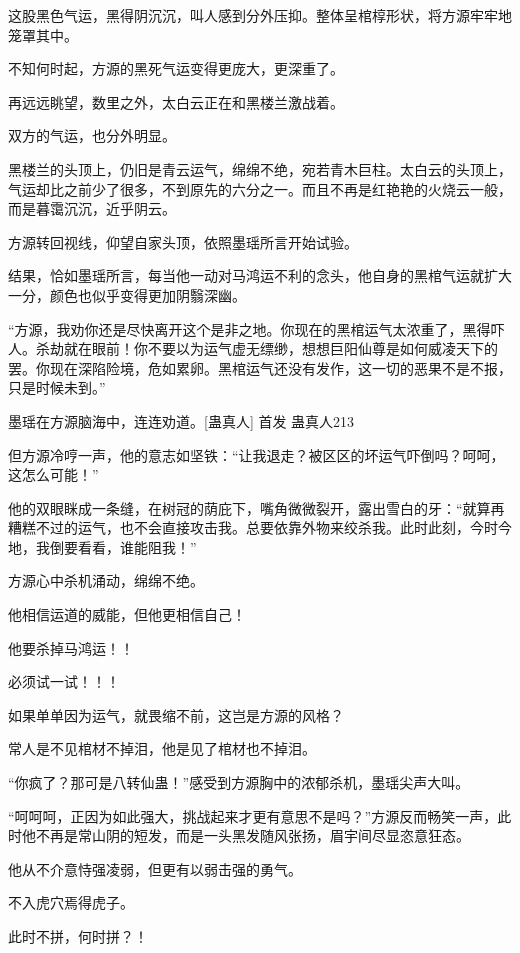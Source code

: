 
\begin{this_body}

这股黑色气运，黑得阴沉沉，叫人感到分外压抑。整体呈棺椁形状，将方源牢牢地笼罩其中。

不知何时起，方源的黑死气运变得更庞大，更深重了。

再远远眺望，数里之外，太白云正在和黑楼兰激战着。

双方的气运，也分外明显。

黑楼兰的头顶上，仍旧是青云运气，绵绵不绝，宛若青木巨柱。太白云的头顶上，气运却比之前少了很多，不到原先的六分之一。而且不再是红艳艳的火烧云一般，而是暮霭沉沉，近乎阴云。

方源转回视线，仰望自家头顶，依照墨瑶所言开始试验。

结果，恰如墨瑶所言，每当他一动对马鸿运不利的念头，他自身的黑棺气运就扩大一分，颜色也似乎变得更加阴翳深幽。

“方源，我劝你还是尽快离开这个是非之地。你现在的黑棺运气太浓重了，黑得吓人。杀劫就在眼前！你不要以为运气虚无缥缈，想想巨阳仙尊是如何威凌天下的罢。你现在深陷险境，危如累卵。黑棺运气还没有发作，这一切的恶果不是不报，只是时候未到。”

墨瑶在方源脑海中，连连劝道。[蛊真人]  首发 蛊真人213

但方源冷哼一声，他的意志如坚铁：“让我退走？被区区的坏运气吓倒吗？呵呵，这怎么可能！”

他的双眼眯成一条缝，在树冠的荫庇下，嘴角微微裂开，露出雪白的牙：“就算再糟糕不过的运气，也不会直接攻击我。总要依靠外物来绞杀我。此时此刻，今时今地，我倒要看看，谁能阻我！”

方源心中杀机涌动，绵绵不绝。

他相信运道的威能，但他更相信自己！

他要杀掉马鸿运！！

必须试一试！！！

如果单单因为运气，就畏缩不前，这岂是方源的风格？

常人是不见棺材不掉泪，他是见了棺材也不掉泪。

“你疯了？那可是八转仙蛊！”感受到方源胸中的浓郁杀机，墨瑶尖声大叫。

“呵呵呵，正因为如此强大，挑战起来才更有意思不是吗？”方源反而畅笑一声，此时他不再是常山阴的短发，而是一头黑发随风张扬，眉宇间尽显恣意狂态。

他从不介意恃强凌弱，但更有以弱击强的勇气。

不入虎穴焉得虎子。

此时不拼，何时拼？！


\end{this_body}
